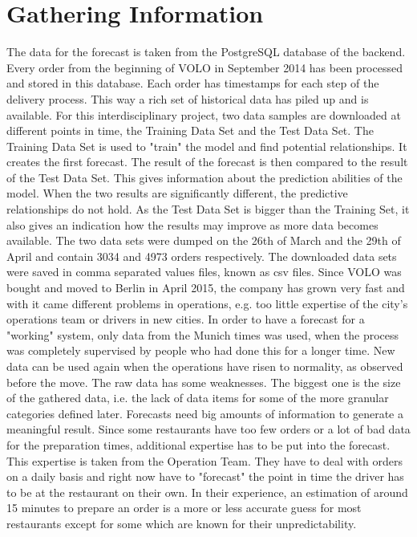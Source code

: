 \section{Gathering Information}\label{section:Gathering Information}
The data for the forecast is taken from the PostgreSQL database of the backend. Every order from the beginning of VOLO in September 2014 has been processed and stored in this database. Each order has timestamps for each step of the delivery process. This way a rich set of historical data has piled up and is available. For this interdisciplinary project, two data samples are downloaded at different points in time, the Training Data Set and the Test Data Set. The Training Data Set is used to "train" the model and find potential relationships. It creates the first forecast. The result of the forecast is then compared to the result of the Test Data Set. This gives information about the prediction abilities of the model. When the two results are significantly different, the predictive relationships do not hold. As the Test Data Set is bigger than the Training Set, it also gives an indication how the results may improve as more data becomes available. The two data sets were dumped on the 26th of March and the 29th of April and contain 3034 and 4973 orders respectively. The downloaded data sets were saved in comma separated values files, known as csv files. Since VOLO was bought and moved to Berlin in April 2015, the company has grown very fast and with it came different problems in operations, e.g. too little expertise of the city's operations team or drivers in new cities. In order to have a forecast for a "working" system, only data from the Munich times was used, when the process was completely supervised by people who had done this for a longer time. New data can be used again when the operations have risen to normality, as observed before the move.
\newpage
The raw data has some weaknesses. The biggest one is the size of the gathered data, i.e. the lack of data items for some of the more granular categories defined later. Forecasts need big amounts of information to generate a meaningful result. Since some restaurants have too few orders or a lot of bad data for the preparation times, additional expertise has to be put into the forecast. This expertise is taken from the Operation Team. They have to deal with orders on a daily basis and right now have to "forecast" the point in time the driver has to be at the restaurant on their own. In their experience, an estimation of around 15 minutes to prepare an order is a more or less accurate guess for most restaurants except for some which are known for their unpredictability.\newline
